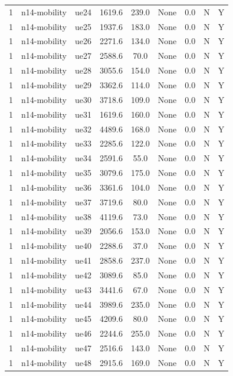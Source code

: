 \begin{table}[ht]
\begin{tabular}{|c|c|c|c|c|c|c|c|c|}
1 & n14-mobility & ue24 & 1619.6 & 239.0 & None & 0.0 & N & Y \\
1 & n14-mobility & ue25 & 1937.6 & 183.0 & None & 0.0 & N & Y \\
1 & n14-mobility & ue26 & 2271.6 & 134.0 & None & 0.0 & N & Y \\
1 & n14-mobility & ue27 & 2588.6 & 70.0 & None & 0.0 & N & Y \\
1 & n14-mobility & ue28 & 3055.6 & 154.0 & None & 0.0 & N & Y \\
1 & n14-mobility & ue29 & 3362.6 & 114.0 & None & 0.0 & N & Y \\
1 & n14-mobility & ue30 & 3718.6 & 109.0 & None & 0.0 & N & Y \\
1 & n14-mobility & ue31 & 1619.6 & 160.0 & None & 0.0 & N & Y \\
1 & n14-mobility & ue32 & 4489.6 & 168.0 & None & 0.0 & N & Y \\
1 & n14-mobility & ue33 & 2285.6 & 122.0 & None & 0.0 & N & Y \\
1 & n14-mobility & ue34 & 2591.6 & 55.0 & None & 0.0 & N & Y \\
1 & n14-mobility & ue35 & 3079.6 & 175.0 & None & 0.0 & N & Y \\
1 & n14-mobility & ue36 & 3361.6 & 104.0 & None & 0.0 & N & Y \\
1 & n14-mobility & ue37 & 3719.6 & 80.0 & None & 0.0 & N & Y \\
1 & n14-mobility & ue38 & 4119.6 & 73.0 & None & 0.0 & N & Y \\
1 & n14-mobility & ue39 & 2056.6 & 153.0 & None & 0.0 & N & Y \\
1 & n14-mobility & ue40 & 2288.6 & 37.0 & None & 0.0 & N & Y \\
1 & n14-mobility & ue41 & 2858.6 & 237.0 & None & 0.0 & N & Y \\
1 & n14-mobility & ue42 & 3089.6 & 85.0 & None & 0.0 & N & Y \\
1 & n14-mobility & ue43 & 3441.6 & 67.0 & None & 0.0 & N & Y \\
1 & n14-mobility & ue44 & 3989.6 & 235.0 & None & 0.0 & N & Y \\
1 & n14-mobility & ue45 & 4209.6 & 80.0 & None & 0.0 & N & Y \\
1 & n14-mobility & ue46 & 2244.6 & 255.0 & None & 0.0 & N & Y \\
1 & n14-mobility & ue47 & 2516.6 & 143.0 & None & 0.0 & N & Y \\
1 & n14-mobility & ue48 & 2915.6 & 169.0 & None & 0.0 & N & Y \\

\end{tabular}
\end{table}
